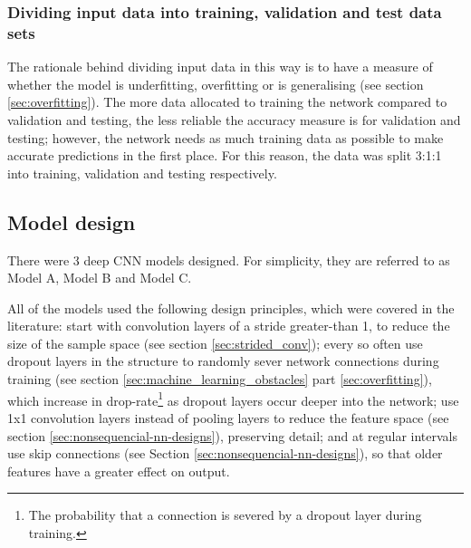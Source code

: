 \documentclass[12pt]{article}
\begin{document}
    \subsubsection{Dividing input data into training, validation and test data sets}
    The rationale behind dividing input data in this way is to have a measure of whether the model is underfitting, overfitting or is generalising (see section \ref{sec:overfitting}). The more data allocated to training the network compared to validation and testing, the less reliable the accuracy measure is for validation and testing; however, the network needs as much training data as possible to make accurate predictions in the first place. For this reason, the data was split 3:1:1 into training, validation and testing respectively. 
    
    \subsection{Model design}
    There were 3 deep CNN models designed. For simplicity, they are referred to as Model A, Model B and Model C.\medskip
    
    All of the models used the following design principles, which were covered in the literature: start with convolution layers of a stride greater-than 1, to reduce the size of the sample space (see section \ref{sec:strided_conv}); every so often use dropout layers in the structure to randomly sever network connections during training (see section \ref{sec:machine_learning_obstacles} part \ref{sec:overfitting}), which increase in drop-rate\footnote{The probability that a connection is severed by a dropout layer during training.} as dropout layers occur deeper into the network; use 1x1 convolution layers instead of pooling layers to reduce the feature space (see section \ref{sec:nonsequencial-nn-designs}), preserving detail; and at regular intervals use skip connections (see Section \ref{sec:nonsequencial-nn-designs}), so that older features have a greater effect on output.\medskip
    
\end{document}
